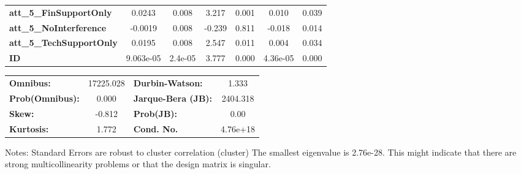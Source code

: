 \begin{center}
\begin{tabular}{lcccccc}
\textbf{att\_5\_FinSupportOnly}      &       0.0243  &        0.008     &     3.217  &         0.001        &        0.010    &        0.039     \\
\textbf{att\_5\_NoInterference}      &      -0.0019  &        0.008     &    -0.239  &         0.811        &       -0.018    &        0.014     \\
\textbf{att\_5\_TechSupportOnly}     &       0.0195  &        0.008     &     2.547  &         0.011        &        0.004    &        0.034     \\
\textbf{ID}                          &    9.063e-05  &      2.4e-05     &     3.777  &         0.000        &     4.36e-05    &        0.000     \\
\bottomrule
\end{tabular}
\begin{tabular}{lclc}
\textbf{Omnibus:}       & 17225.028 & \textbf{  Durbin-Watson:     } &    1.333  \\
\textbf{Prob(Omnibus):} &    0.000  & \textbf{  Jarque-Bera (JB):  } & 2404.318  \\
\textbf{Skew:}          &   -0.812  & \textbf{  Prob(JB):          } &     0.00  \\
\textbf{Kurtosis:}      &    1.772  & \textbf{  Cond. No.          } & 4.76e+18  \\
\bottomrule
\end{tabular}
\end{center}

Notes: \newline
 [1] Standard Errors are robust to cluster correlation (cluster) \newline
 [2] The smallest eigenvalue is 2.76e-28. This might indicate that there are \newline
 strong multicollinearity problems or that the design matrix is singular.